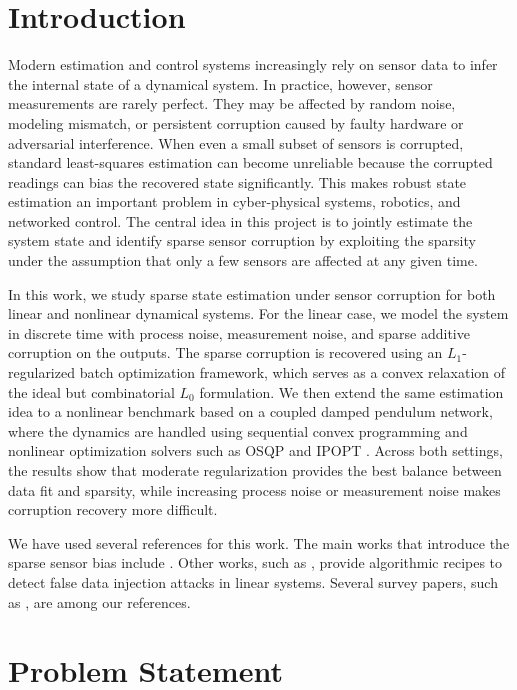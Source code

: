 \documentclass[conference]{IEEEtran}
\begin{document}
\section{Introduction}
Modern estimation and control systems increasingly rely on sensor data to infer the internal state of a dynamical system. In practice, however, sensor measurements are rarely perfect. They may be affected by random noise, modeling mismatch, or persistent corruption caused by faulty hardware or adversarial interference. When even a small subset of sensors is corrupted, standard least-squares estimation can become unreliable because the corrupted readings can bias the recovered state significantly. This makes robust state estimation an important problem in cyber-physical systems, robotics, and networked control. The central idea in this project is to jointly estimate the system state and identify sparse sensor corruption by exploiting the sparsity under the assumption that only a few sensors are affected at any given time. 

In this work, we study sparse state estimation under sensor corruption for both linear and nonlinear dynamical systems. For the linear case, we model the system in discrete time with process noise, measurement noise, and sparse additive corruption on the outputs. The sparse corruption is recovered using an \(L_1\)-regularized batch optimization framework, which serves as a convex relaxation of the ideal but combinatorial \(L_0\) formulation. We then extend the same estimation idea to a nonlinear benchmark based on a coupled damped pendulum network, where the dynamics are handled using sequential convex programming and nonlinear optimization solvers such as OSQP\cite{osqp} and IPOPT \cite{ref:waechter-biegler-ipopt-2006}. Across both settings, the results show that moderate regularization provides the best balance between data fit and sparsity, while increasing process noise or measurement noise makes corruption recovery more difficult.

We have used several references for this work. The main works that introduce the sparse sensor bias include \cite{sandberg2022secure,mishra2017secure}. Other works, such as \cite{das2025algorithmic}, provide algorithmic recipes to detect false data injection attacks in linear systems. Several survey papers, such as \cite{ding2018survey,giraldo2018survey,mitchell2014survey,he2016cyber}, are among our references.
\section{Problem Statement}
\end{document}
